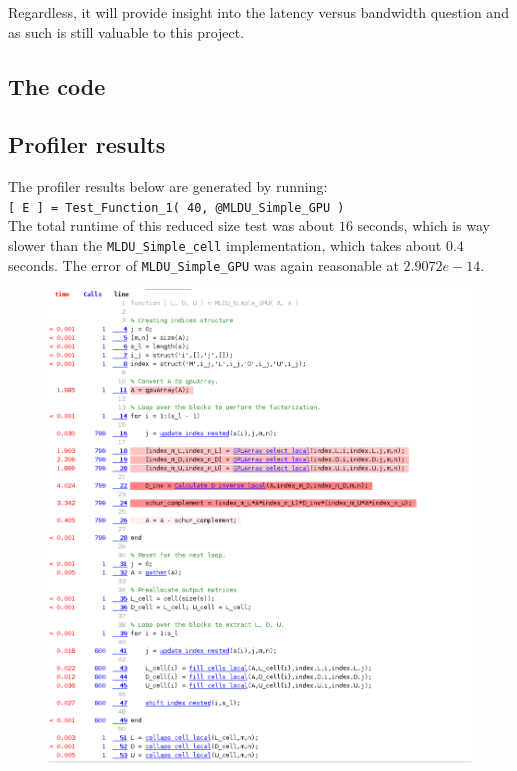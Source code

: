 \noindent Regardless, it will provide insight into the latency versus bandwidth question and as such is still valuable to this project.

\newpage

\subsection{The code}



\subsection{Profiler results}

\noindent The profiler results below are generated by running:\\

\noindent \texttt{[ E ] = Test\_Function\_1( 40, @MLDU\_Simple\_GPU )}\\

\noindent The total runtime of this reduced size test was about $16$ seconds, which is way slower than the \texttt{MLDU\_Simple\_cell} implementation, which takes about $0.4$ seconds. The error of \texttt{MLDU\_Simple\_GPU} was again reasonable at $2.9072e-14$.

\begin{figure}[h!]
    \includegraphics[width=\linewidth]{figures/Profile_MLDU_Simple_GPU_1.eps}
    \centering
\end{figure}

